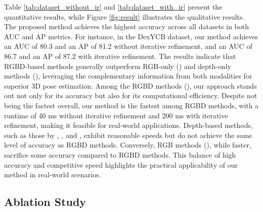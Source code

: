 Table \ref{tab:dataset_without_ir} and \ref{tab:dataset_with_ir} present the quantitative results, while Figure \ref{fig:result} illustrates the qualitative results. The proposed method achieves the highest accuracy across all datasets in both AUC and AP metrics. For instance, in the DexYCB dataset, our method achieves an AUC of 80.3 and an AP of 81.2 without iterative refinement, and an AUC of 86.7 and an AP of 87.2 with iterative refinement. The results indicate that RGBD-based methods generally outperform RGB-only (\cite{billings2019silhonet, peng2019pvnet, wang2021gdr, castro2023crt}) and depth-only methods (\cite{wang20216d, gao20206d, guo2021efficient}), leveraging the complementary information from both modalities for superior 3D pose estimation. Among the RGBD methods (\cite{wang2019densefusion, he2020pvn3d, he2021ffb6d, wu2023geometric, hong2024rdpn6d, lin2024hipose}), our approach stands out not only for its accuracy but also for its computational efficiency. Despite not being the fastest overall, our method is the fastest among RGBD methods, with a runtime of 40 ms without iterative refinement and 200 ms with iterative refinement, making it feasible for real-world applications. Depth-based methods, such as those by \cite{wang20216d}, \cite{gao20206d}, and \cite{guo2021efficient}, exhibit reasonable speeds but do not achieve the same level of accuracy as RGBD methods. Conversely, RGB methods (\cite{billings2019silhonet, peng2019pvnet, wang2021gdr, castro2023crt}), while faster, sacrifice some accuracy compared to RGBD methods. This balance of high accuracy and competitive speed highlights the practical applicability of our method in real-world scenarios.

\subsection{Ablation Study}

